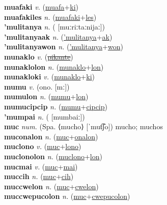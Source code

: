 \textbf{muafaki} \textit{v.} (\hyperref[muafa]{muafa}+\hyperref[ki]{ki})
 \label{muafaki} \\
\textbf{muafakiles} \textit{n.} (\hyperref[muafaki]{muafaki}+\hyperref[les]{les})
 \label{muafakiles} \\
\textbf{'mulitanya} \textit{n.} ( [muːriːtaːnijaː])
 \label{'mulitanya} \\
\textbf{'mulitanyaak} \textit{n.} (\hyperref['mulitanya]{'mulitanya}+\hyperref[ak]{ak})
 \label{'mulitanyaak} \\
\textbf{'mulitanyawon} \textit{n.} (\hyperref['mulitanya]{'mulitanya}+\hyperref[won]{won})
 \label{'mulitanyawon} \\
\textbf{munaklo} \textit{v.} (\hyperref[pikante]{\sout{pikante}})
 \label{munaklo} \\
\textbf{munaklolon} \textit{n.} (\hyperref[munaklo]{munaklo}+\hyperref[lon]{lon})
 \label{munaklolon} \\
\textbf{munakloki} \textit{v.} (\hyperref[munaklo]{munaklo}+\hyperref[ki]{ki})
 \label{munakloki} \\
\textbf{mumu} \textit{v.} (ono. [mː])
 \label{mumu} \\
\textbf{mumulon} \textit{n.} (\hyperref[mumu]{mumu}+\hyperref[lon]{lon})
 \label{mumulon} \\
\textbf{mumucipcip} \textit{n.} (\hyperref[mumu]{mumu}+\hyperref[cipcip]{cipcip})
 \label{mumucipcip} \\
\textbf{'mumpai} \textit{n.} ( [mumbaiː])
 \label{'mumpai} \\
\textbf{muc} \textit{num.} (Spa. ⟨mucho⟩ [ˈmut͡ʃo])
mucho; muchos \label{muc} \\
\textbf{muconalon} \textit{n.} (\hyperref[muc]{muc}+\hyperref[onalon]{onalon})
 \label{muconalon} \\
\textbf{muclono} \textit{v.} (\hyperref[muc]{muc}+\hyperref[lono]{lono})
 \label{muclono} \\
\textbf{muclonolon} \textit{n.} (\hyperref[muclono]{muclono}+\hyperref[lon]{lon})
 \label{muclonolon} \\
\textbf{mucmai} \textit{v.} (\hyperref[muc]{muc}+\hyperref[mai]{mai})
 \label{mucmai} \\
\textbf{muccih} \textit{n.} (\hyperref[muc]{muc}+\hyperref[cih]{cih})
 \label{muccih} \\
\textbf{muccwelon} \textit{n.} (\hyperref[muc]{muc}+\hyperref[cwelon]{cwelon})
 \label{muccwelon} \\
\textbf{muccwepucolon} \textit{n.} (\hyperref[muc]{muc}+\hyperref[cwepucolon]{cwepucolon})
